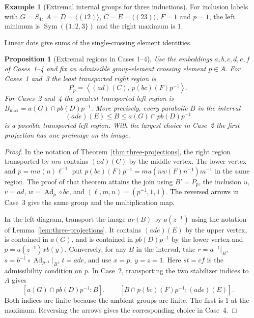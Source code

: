 \documentclass[11pt,a4paper]{article}
\numberwithin{equation}{section}
\newtheorem{proposition}[theorem]{Proposition}
\theoremstyle{definition}
\newtheorem{example}{Example}[section]
\begin{document}
\begin{example}[Extremal internal groups for three inductions]\label{ex:three-induction-extrema}
For inclusion labels with \(G=S_4\), \(A=D=\langle(12)\rangle\),
\(C=E=\langle(23)\rangle\), \(F=1\) and \(p=1\), the left minimum
is \(\operatorname{Sym}(\{1,2,3\})\) and the right maximum is \(1\).
\end{example}

Linear dots give sums of the single-crossing element identities.

\begin{proposition}[Extremal regions in Cases 1--4]\label{prop:parabolic-three-outside}
Use the embeddings \(a,b,c,d,e,f\) of Cases~1--4 and fix an
admissible group-element crossing element \(p\in A\).
For Cases~1 and~3 the least transported right region is
\[
 P_p=\left\langle (ad)(C),\,p(bc)(F)p^{-1}\right\rangle.
\]
For Cases~2 and~4 the greatest transported left region is
\(B_{\max}=a(G)\cap p b(D)p^{-1}\). More precisely, every parabolic \(B\)
in the interval
\[
 (ade)(E)\le B\le a(G)\cap p b(D)p^{-1}
\]
is a possible transported left region. With the largest choice
in Case~2 the first projection has one preimage on its image.
\end{proposition}

\begin{proof}
In the notation of Theorem~\ref{thm:three-projections}, the right
region transported by \(m u\) contains \((ad)(C)\) by the middle
vertex. The lower vertex and \(p=m u(n)\ell^{-1}\) put
\(p(bc)(F)p^{-1}=m u(n w(F)n^{-1})m^{-1}\) in the same region.
The proof of that theorem attains the join using \(B'=P_p\),
the inclusion \(u\), \(v=ad\), \(w=\operatorname{Ad}_p\circ bc\),
and \((\ell,m,n)=(p^{-1},1,1)\). The reversed arrows in Case~3
give the same group and the multiplication map.

In the left diagram, transport the image \(a r(B)\) by \(a(z^{-1})\)
using the notation of Lemma~\ref{lem:three-projections}. It
contains \((ade)(E)\) by the upper vertex, is contained in \(a(G)\),
and is contained in \(p b(D)p^{-1}\) by the lower vertex and
\(p=a(z^{-1})x b(y)\). Conversely, for any \(B\) in the interval,
take \(r=a^{-1}|_B\),
\(s=b^{-1}\circ\operatorname{Ad}_{p^{-1}}|_B\), \(t=ade\),
and use \(x=p,\ y=z=1\). Here \(st=cf\) is the admissibility
condition on \(p\). In Case~2, transporting the two stabilizer
indices to \(A\) gives
\[
 [a(G)\cap p b(D)p^{-1}:B],\qquad
 [B\cap p(bc)(F)p^{-1}:(ade)(E)].
\]
Both indices are finite because the ambient groups are finite.
The first is \(1\) at the maximum. Reversing the arrows gives
the corresponding choice in Case~4.
\end{proof}
\end{document}
